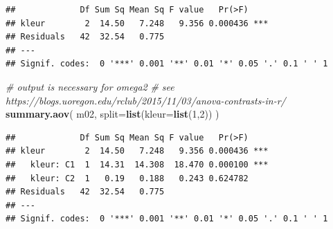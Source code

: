 \documentclass[
]{book}
\newenvironment{Shaded}{\begin{snugshade}}{\end{snugshade}}
\newcommand{\AttributeTok}[1]{\textcolor[rgb]{0.13,0.29,0.53}{#1}}
\newcommand{\CommentTok}[1]{\textcolor[rgb]{0.56,0.35,0.01}{\textit{#1}}}
\newcommand{\DecValTok}[1]{\textcolor[rgb]{0.00,0.00,0.81}{#1}}
\newcommand{\FunctionTok}[1]{\textcolor[rgb]{0.13,0.29,0.53}{\textbf{#1}}}
\newcommand{\NormalTok}[1]{#1}
\newcommand{\OtherTok}[1]{\textcolor[rgb]{0.56,0.35,0.01}{#1}}
\newcommand{\SpecialCharTok}[1]{\textcolor[rgb]{0.81,0.36,0.00}{\textbf{#1}}}
\newcommand{\StringTok}[1]{\textcolor[rgb]{0.31,0.60,0.02}{#1}}
\begin{document}
\begin{Shaded}
\end{Shaded}

\begin{verbatim}
##             Df Sum Sq Mean Sq F value   Pr(>F)    
## kleur        2  14.50   7.248   9.356 0.000436 ***
## Residuals   42  32.54   0.775                     
## ---
## Signif. codes:  0 '***' 0.001 '**' 0.01 '*' 0.05 '.' 0.1 ' ' 1
\end{verbatim}

\begin{Shaded}
\begin{Highlighting}[]
\CommentTok{\# output is necessary for omega2}
\CommentTok{\# see https://blogs.uoregon.edu/rclub/2015/11/03/anova{-}contrasts{-}in{-}r/}
\FunctionTok{summary.aov}\NormalTok{( m02, }\AttributeTok{split=}\FunctionTok{list}\NormalTok{(}\AttributeTok{kleur=}\FunctionTok{list}\NormalTok{(}\DecValTok{1}\NormalTok{,}\DecValTok{2}\NormalTok{)) )}
\end{Highlighting}
\end{Shaded}

\begin{verbatim}
##             Df Sum Sq Mean Sq F value   Pr(>F)    
## kleur        2  14.50   7.248   9.356 0.000436 ***
##   kleur: C1  1  14.31  14.308  18.470 0.000100 ***
##   kleur: C2  1   0.19   0.188   0.243 0.624782    
## Residuals   42  32.54   0.775                     
## ---
## Signif. codes:  0 '***' 0.001 '**' 0.01 '*' 0.05 '.' 0.1 ' ' 1
\end{verbatim}
\end{document}
